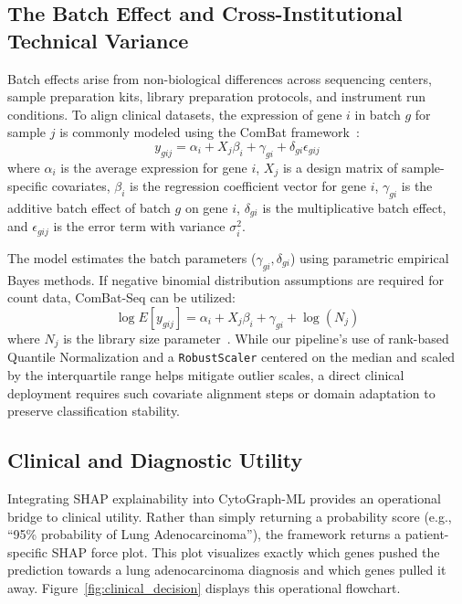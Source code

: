 \documentclass[journal,10pt]{IEEEtran}
\begin{document}
\subsection{The Batch Effect and Cross-Institutional Technical Variance}
Batch effects arise from non-biological differences across sequencing centers, sample preparation kits, library preparation protocols, and instrument run conditions. To align clinical datasets, the expression of gene $i$ in batch $g$ for sample $j$ is commonly modeled using the ComBat framework~\cite{combat}:
\begin{equation}
y_{gij} = \alpha_i + X_j \beta_i + \gamma_{gi} + \delta_{gi} \epsilon_{gij}
\end{equation}
where $\alpha_i$ is the average expression for gene $i$, $X_j$ is a design matrix of sample-specific covariates, $\beta_i$ is the regression coefficient vector for gene $i$, $\gamma_{gi}$ is the additive batch effect of batch $g$ on gene $i$, $\delta_{gi}$ is the multiplicative batch effect, and $\epsilon_{gij}$ is the error term with variance $\sigma_i^2$. 

The model estimates the batch parameters ($\gamma_{gi}, \delta_{gi}$) using parametric empirical Bayes methods. If negative binomial distribution assumptions are required for count data, ComBat-Seq can be utilized:
\begin{equation}
\log E[y_{gij}] = \alpha_i + X_j \beta_i + \gamma_{gi} + \log(N_j)
\end{equation}
where $N_j$ is the library size parameter~\cite{combat_seq}. While our pipeline's use of rank-based Quantile Normalization and a \texttt{RobustScaler} centered on the median and scaled by the interquartile range helps mitigate outlier scales, a direct clinical deployment requires such covariate alignment steps or domain adaptation to preserve classification stability.

\subsection{Clinical and Diagnostic Utility}
Integrating SHAP explainability into CytoGraph-ML provides an operational bridge to clinical utility. Rather than simply returning a probability score (e.g., ``95\% probability of Lung Adenocarcinoma''), the framework returns a patient-specific SHAP force plot. This plot visualizes exactly which genes pushed the prediction towards a lung adenocarcinoma diagnosis and which genes pulled it away. Figure~\ref{fig:clinical_decision} displays this operational flowchart.
\end{document}
